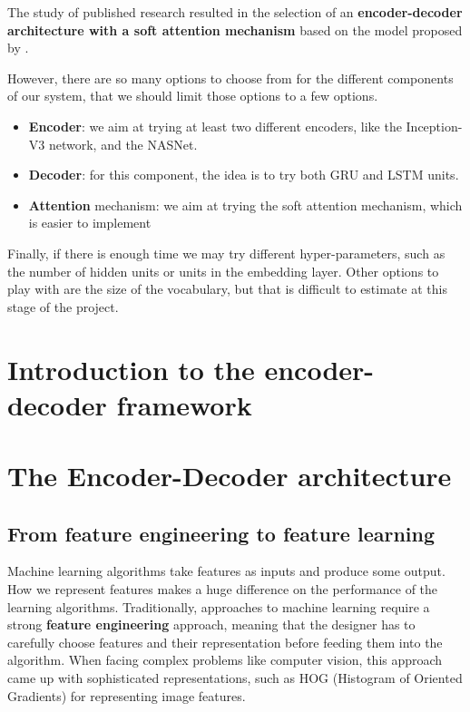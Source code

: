 The study of published research resulted in the selection of an \textbf{encoder-decoder architecture with a soft attention mechanism} based on the model proposed by \citet{Xu2015}. 

However, there are so many options to choose from for the different components of our system, that we should limit those options to a few options.
\begin{itemize}
    \item \textbf{Encoder}: we aim at trying at least two different encoders, like the Inception-V3 network, and the NASNet.
    \item \textbf{Decoder}: for this component, the idea is to try both GRU and LSTM units. 
    \item \textbf{Attention} mechanism: we aim at trying the soft attention mechanism, which is easier to implement
\end{itemize}

Finally, if there is enough time we may try different hyper-parameters, such as the number of hidden units or units in the embedding layer. Other options to play with are the size of the vocabulary, but that is difficult to estimate at this stage of the project.


\section{Introduction to the encoder-decoder framework}

\section{The Encoder-Decoder architecture}\label{sec:encoder-decoder}

\subsection{From feature engineering to feature learning}

Machine learning algorithms take features as inputs and produce some output. How we represent features makes a huge difference on the performance of the learning algorithms.  Traditionally, approaches to machine learning require a strong \textbf{feature engineering} approach, meaning that the designer has to carefully choose features and their representation before feeding them into the algorithm. When facing complex problems like computer vision, this approach came up with sophisticated representations, such as HOG (Histogram of Oriented Gradients) for representing image features.

